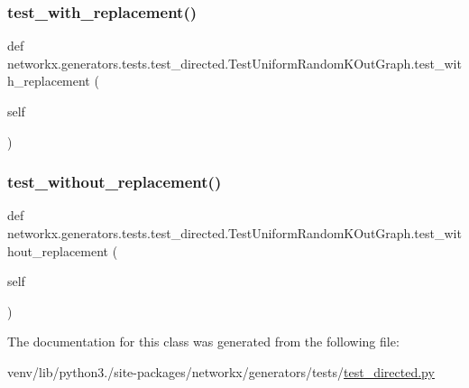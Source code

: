 \subsubsection{\texorpdfstring{test\+\_\+with\+\_\+replacement()}{test\_with\_replacement()}}
{\footnotesize\ttfamily def networkx.\+generators.\+tests.\+test\+\_\+directed.\+Test\+Uniform\+Random\+K\+Out\+Graph.\+test\+\_\+with\+\_\+replacement (\begin{DoxyParamCaption}\item[{}]{self }\end{DoxyParamCaption})}

\mbox{\label{classnetworkx_1_1generators_1_1tests_1_1test__directed_1_1TestUniformRandomKOutGraph_aff9b5ed5c1b25d9fa09e545879ef8bc3}} 
\subsubsection{\texorpdfstring{test\+\_\+without\+\_\+replacement()}{test\_without\_replacement()}}
{\footnotesize\ttfamily def networkx.\+generators.\+tests.\+test\+\_\+directed.\+Test\+Uniform\+Random\+K\+Out\+Graph.\+test\+\_\+without\+\_\+replacement (\begin{DoxyParamCaption}\item[{}]{self }\end{DoxyParamCaption})}



The documentation for this class was generated from the following file\+:\begin{DoxyCompactItemize}
\item 
venv/lib/python3./site-\/packages/networkx/generators/tests/\hyperlink{test__directed_8py}{test\+\_\+directed.\+py}\end{DoxyCompactItemize}
